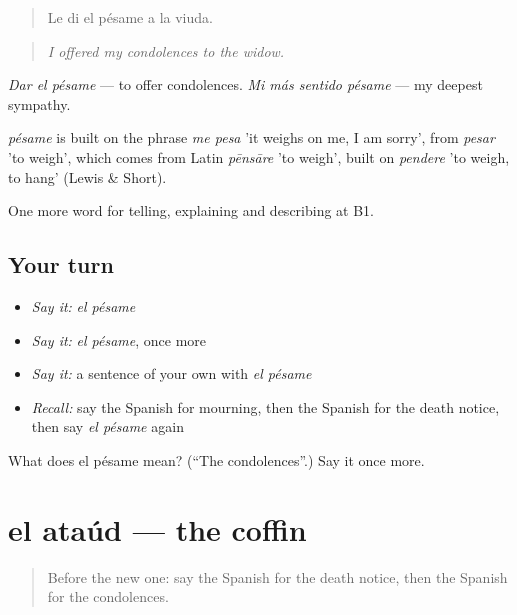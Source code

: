 \begin{quote}
Le di el pésame a la viuda.
\end{quote}

\begin{quote}
\emph{I offered my condolences to the widow.}
\end{quote}

\emph{Dar el pésame} — to offer condolences. \emph{Mi más sentido pésame} — my deepest sympathy.

\begin{cousinweb}
\emph{pésame} is built on the phrase \emph{me pesa} 'it weighs on me, I am sorry', from \emph{pesar} 'to weigh', which comes from Latin \emph{pēnsāre} 'to weigh', built on \emph{pendere} 'to weigh, to hang' (Lewis \& Short).
\end{cousinweb}

\begin{grammarlens}[title={What you've built}]
One more word for telling, explaining and describing at B1.
\end{grammarlens}

\subsection*{Your turn}
\begin{itemize}
\raggedright
  \item \emph{Say it:} \emph{el pésame}
  \item \emph{Say it:} \emph{el pésame}, once more
  \item \emph{Say it:} a sentence of your own with \emph{el pésame}
  \item \emph{Recall:} say the Spanish for mourning, then the Spanish for the death notice, then say \emph{el pésame} again
\end{itemize}

\begin{tcolorbox}[breakable,colback=teal!4,colframe=teal!35!black,title={Before you move on}]
What does el pésame mean? (\textquotedblleft{}The condolences\textquotedblright{}.) Say it once more.
\end{tcolorbox}
\section[el ataúd]{el ataúd — the coffin}

\label{lesson:ES-C557-ataud}



\begin{quote}
Before the new one: say the Spanish for the death notice, then the Spanish for the condolences.
\end{quote}

